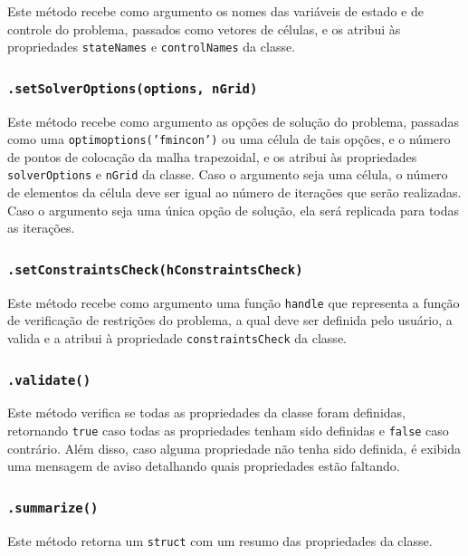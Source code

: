 Este método recebe como argumento os nomes das variáveis de estado e de controle do problema, passados como vetores de células, e os atribui às propriedades \texttt{stateNames} e \texttt{controlNames} da classe.

\subsubsection{\texttt{.setSolverOptions(options, nGrid)}}
\label{subsubsec:setsolveroptions}

Este método recebe como argumento as opções de solução do problema, passadas como uma \texttt{optimoptions('fmincon')} ou uma célula de tais opções, e o número de pontos de colocação da malha trapezoidal, e os atribui às propriedades \texttt{solverOptions} e \texttt{nGrid} da classe. Caso o argumento seja uma célula, o número de elementos da célula deve ser igual ao número de iterações que serão realizadas. Caso o argumento seja uma única opção de solução, ela será replicada para todas as iterações.

\subsubsection{\texttt{.setConstraintsCheck(hConstraintsCheck)}}
\label{subsubsec:setconstraintscheck}

Este método recebe como argumento uma função \texttt{handle} que representa a função de verificação de restrições do problema, a qual deve ser definida pelo usuário, a valida e a atribui à propriedade \texttt{constraintsCheck} da classe.

\subsubsection{\texttt{.validate()}}
\label{subsubsec:validate}

Este método verifica se todas as propriedades da classe foram definidas, retornando \texttt{true} caso todas as propriedades tenham sido definidas e \texttt{false} caso contrário. Além disso, caso alguma propriedade não tenha sido definida, é exibida uma mensagem de aviso detalhando quais propriedades estão faltando.

\subsubsection{\texttt{.summarize()}}
\label{subsubsec:summarize}

Este método retorna um \texttt{struct} com um resumo das propriedades da classe.


